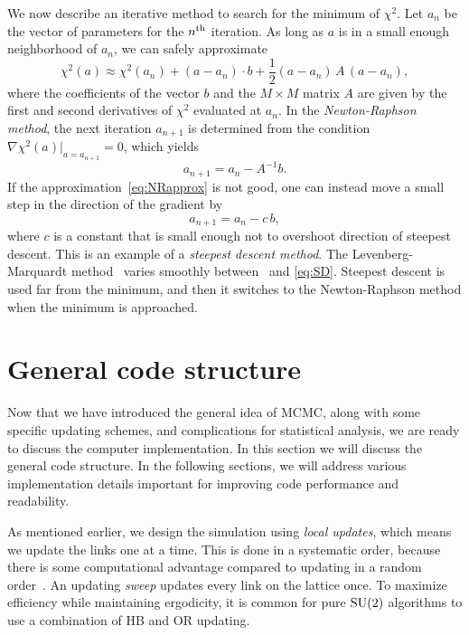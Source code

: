 We now describe an iterative method to search for the minimum of $\chi^2$.
Let $a_n$ be the vector of parameters for the $n{}^{\rm th}$ iteration.
As long as $a$ is in a small enough neighborhood of $a_n$, we can safely
approximate
\begin{equation}\label{eq:NRapprox}
  \chi^2(a)\approx\chi^2(a_n)+(a-a_n)\cdot b
           +\frac{1}{2}(a-a_n)\,A\,(a-a_n),
\end{equation}
where the coefficients of the vector $b$ and the $M\times M$ matrix $A$ 
are given by the first and second derivatives of $\chi^2$ evaluated at $a_n$.
In the {\it Newton-Raphson method}, the next 
iteration $a_{n+1}$ is
determined from the condition $\nabla\chi^2(a)|_{a=a_{n+1}}=0$,
which yields
\begin{equation}\label{eq:NR}
  a_{n+1}=a_n-A^{-1}b.
\end{equation}
If the approximation~\eqref{eq:NRapprox} is not good, one can instead move
a small step in the direction of the gradient by
\begin{equation}\label{eq:SD}
  a_{n+1}=a_n-c\,b,
\end{equation}
where $c$ is a constant that is small enough not to overshoot direction
of steepest descent. This is an example of a {\it steepest descent method}.
The Levenberg-Marquardt 
method~\cite{levenberg_method_1944,marquardt_algorithm_1963} 
varies smoothly between~ and 
\eqref{eq:SD}. Steepest descent is used far from the minimum, and 
then it switches to the Newton-Raphson method when the minimum is approached.

\section{General code structure}

Now that we have introduced the general idea of MCMC, along with some specific
updating schemes, and complications for statistical analysis, we are ready 
to discuss the computer implementation. In this section we will discuss the
general code structure. In the following sections, we will address various
implementation details important for improving code performance and readability. 


As mentioned earlier, we design the simulation using {\it local updates}, which
means we update the links one at a time. This is done in a systematic order,
because there is some computational advantage compared to updating in a
random order~\cite{berg_markov_2004}. 
An updating {\it sweep} updates every link on the lattice once. 
To maximize efficiency while maintaining ergodicity, it is common for pure
$\operatorname{SU}(2)$ algorithms to use
a combination of HB and OR updating. 


